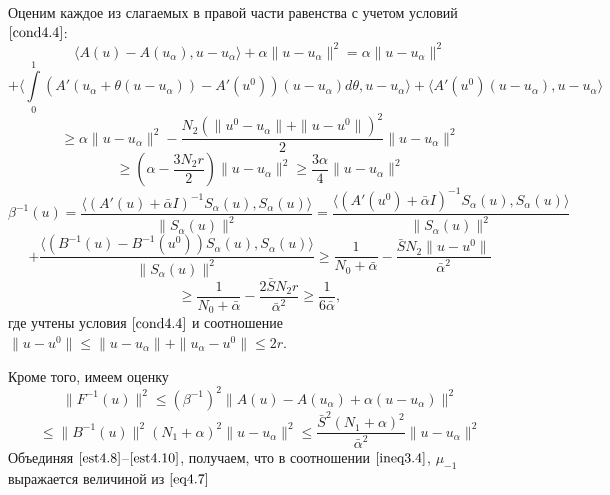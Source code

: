 Оценим каждое из слагаемых в правой части равенства с учетом условий $\eqref{cond4.4}$:
$$\langle A(u)-A(u_\alpha), u-u_\alpha\rangle+\alpha\|u-u_\alpha\|^2=\alpha\|u-u_\alpha\|^2$$ $$+\langle \int\limits_0^1 (A'(u_\alpha+\theta(u-u_\alpha))-A'(u^0))(u-u_\alpha)d\theta, u-u_\alpha\rangle+\langle A'(u^0)(u-u_\alpha), u-u_\alpha\rangle$$ $$\ge \alpha\|u-u_\alpha\|^2-\frac{N_2(\|u^0-u_\alpha\|+\|u-u^0\|)^2}{2}\|u-u_\alpha\|^2$$
\begin{equation}\label {est4.8}
\ge\left ( \alpha-\frac{3N_2 r}{2}\right )\|u-u_\alpha\|^2\ge\frac{3\alpha}{4}\|u-u_\alpha\|^2
\end{equation}
$$\beta ^{-1}(u)=\frac{\langle (A'(u)+\bar\alpha I)^{-1}S_\alpha(u), S_\alpha(u)\rangle}{\|S_\alpha(u)\|^2}=\frac{\langle (A'(u^0)+\bar\alpha I)^{-1}S_\alpha(u), S_\alpha(u)\rangle}{\|S_\alpha(u)\|^2}$$ $$+\frac{\langle (B^{-1}(u)-B^{-1}(u^0))S_\alpha(u), S_\alpha(u)\rangle}{\|S_\alpha(u)\|^2}\ge\frac{1}{N_0+\bar\alpha}-\frac{\bar S N_2\|u-u^0\|}{\bar\alpha^2}$$
\begin{equation}\label{est4.9}
\ge\frac{1}{N_0+\bar\alpha}-\frac{2\bar S N_2 r}{\bar\alpha^2}\ge\frac{1}{6\bar\alpha},
\end{equation}
где учтены условия $\eqref{cond4.4}$ и соотношение $\|u-u^0\|\le\|u-u_\alpha\|+\|u_\alpha-u^0\|\le 2r$.

Кроме того, имеем оценку
$$\|F^{-1}(u)\|^2\le(\beta^{-1})^2\|A(u)-A(u_\alpha)+\alpha(u-u_\alpha)\|^2$$
\begin{equation}\label{est4.10}
\le\|B^{-1}(u)\|^2(N_1+\alpha)^2\|u-u_\alpha\|^2\le\frac{\bar S^2(N_1+\alpha)^2}{\bar\alpha^2}\|u-u_\alpha\|^2
\end{equation}
Объединяя $\eqref{est4.8}$--$\eqref{est4.10}$, получаем, что в соотношении $\eqref{ineq3.4}$, $\mu_{-1}$ выражается величиной из $\eqref{eq4.7}$

